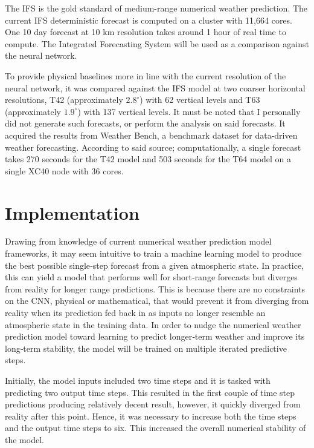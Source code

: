 The IFS is the gold standard of medium-range numerical weather prediction. The current IFS deterministic forecast is computed on a cluster with 11,664 cores. One 10 day forecast at 10 km resolution takes around 1 hour of real time to compute\cite{rasp2020weatherbench}. The Integrated Forecasting System will be used as a comparison against the neural network.

To provide physical baselines more in line with the current resolution of the neural network, it was compared against the IFS model at two coarser horizontal resolutions, T42 (approximately $2.8^{\circ}$) with 62 vertical levels and T63 (approximately $1.9^{\circ}$) with 137 vertical levels. It must be noted that I personally did not generate such forecasts, or perform the analysis on said forecasts. It acquired the results from Weather Bench, a benchmark dataset for data-driven weather forecasting. According to said source; computationally, a single forecast takes 270 seconds for the T42 model and 503 seconds for the T64 model on a single XC40 node with 36 cores.

\section{Implementation}\label{implement_rnn}
Drawing from knowledge of current numerical weather prediction model frameworks, it may seem intuitive to train a machine learning model to produce the best possible single‐step forecast from a given atmospheric state. In practice, this can yield a model that performs well for short‐range forecasts but diverges from reality for longer range predictions. This is because there are no constraints on the CNN, physical or mathematical, that would prevent it from diverging from reality when its prediction fed back in as inputs no longer resemble an atmospheric state in the training data. In order to nudge the numerical weather prediction model toward learning to predict longer‐term weather and improve its long‐term stability, the model will be trained on multiple iterated predictive steps. 

Initially, the model inputs included two time steps and it is tasked with predicting two output time steps. This resulted in the first couple of time step predictions producing relatively decent result, however, it quickly diverged from reality after this point. Hence, it was necessary to increase both the time steps and the output time steps to six. This increased the overall numerical stability of the model. 

